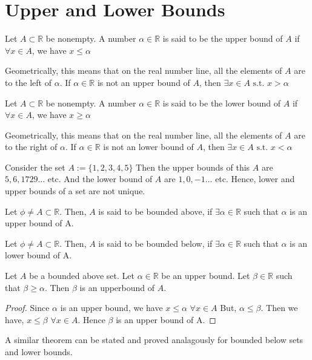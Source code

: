 \documentclass{scrartcl}
\newcommand{\rn}{\mathbb{R}}
\begin{document}
    \section{Upper and Lower Bounds}
    \begin{definition}
        Let $A \subset \rn$ be nonempty. A number $\alpha \in \rn$ is said to be the upper bound of $A$ if $\forall x \in A$, we have $x \leq \alpha$
    \end{definition}
    Geometrically, this means that on the real number line, all the elements of $A$ are to the left of $\alpha$. If $\alpha \in \rn$ is not an upper bound of $A$, then $\exists x \in A \text{ s.t. } x > \alpha$
    \begin{definition}
        Let $A \subset \rn$ be nonempty. A number $\alpha \in \rn$ is said to be the lower bound of $A$ if $\forall x \in A$, we have $x \geq \alpha$
    \end{definition}
    Geometrically, this means that on the real number line, all the elements of $A$ are to the right of $\alpha$. If $\alpha \in \rn$ is not an lower bound of $A$, then $\exists x \in A \text{ s.t. } x < \alpha$
    \begin{example}
        Consider the set $A := \{1, 2, 3, 4, 5\}$ Then the upper bounds of this $A$ are $5, 6, 1729 \dots$ etc.
        And the lower bound of $A$ are $1, 0, -1 \dots$ etc. Hence, lower and upper bounds of a set are not unique.
    \end{example}
    \begin{definition}
        Let $\phi \neq A \subset \rn$. Then, $A$ is said to be bounded above, if $\exists \alpha \in \rn$ such that $\alpha$ is an upper bound of A.
    \end{definition}
    \begin{definition}
        Let $\phi \neq A \subset \rn$. Then, $A$ is said to be bounded below, if $\exists \alpha \in \rn$ such that $\alpha$ is an lower bound of A.
    \end{definition}
    \begin{theorem}
        Let $A$ be a bounded above set. Let $\alpha \in \rn$ be an upper bound. Let $\beta \in \rn$ such that 
        $\beta \geq \alpha$. Then $\beta$ is an upperbound of $A$.
        \begin{proof}
            Since $\alpha$ is an upper bound, we have $x \leq \alpha \,\, \forall x \in A$
            But, $\alpha \leq \beta$. Then we have, $x \leq \beta \,\, \forall x \in A$.
            Hence $\beta$ is an upper bound of A.
        \end{proof}
    A similar theorem can be stated and proved analagously for bounded below sets and lower bounds.
    \end{theorem}
\end{document}
